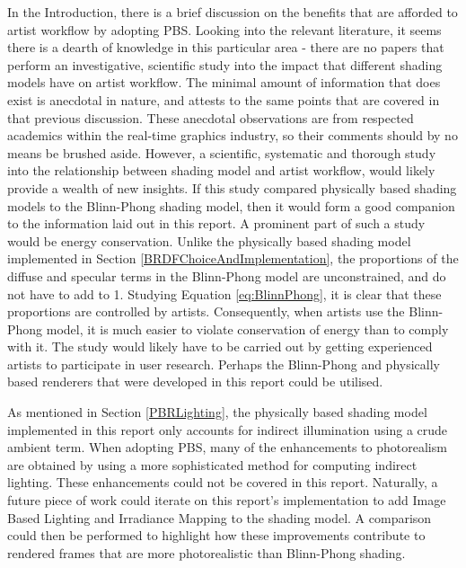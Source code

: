 In the Introduction, there is a brief discussion on the benefits that are afforded to artist workflow by adopting PBS. Looking into the relevant literature, it seems there is a dearth of knowledge in this particular area - there are no papers that perform an investigative, scientific study into the impact that different shading models have on artist workflow. The minimal amount of information that does exist is anecdotal in nature, and attests to the same points that are covered in that previous discussion. These anecdotal observations are from respected academics within the real-time graphics industry, so their comments should by no means be brushed aside. However, a scientific, systematic and thorough study into the relationship between shading model and artist workflow, would likely provide a wealth of new insights. If this study compared physically based shading models to the Blinn-Phong shading model, then it would form a good companion to the information laid out in this report. A prominent part of such a study would be energy conservation. Unlike the physically based shading model implemented in Section \ref{BRDFChoiceAndImplementation}, the proportions of the diffuse and specular terms in the Blinn-Phong model are unconstrained, and do not have to add to 1. Studying Equation \ref{eq:BlinnPhong}, it is clear that these proportions are controlled by artists. Consequently, when artists use the Blinn-Phong model, it is much easier to violate conservation of energy than to comply with it. The study would likely have to be carried out by getting experienced artists to participate in user research. Perhaps the Blinn-Phong and physically based renderers that were developed in this report could be utilised.

As mentioned in Section \ref{PBRLighting}, the physically based shading model implemented in this report only accounts for indirect illumination using a crude ambient term. When adopting PBS, many of the enhancements to photorealism are obtained by using a more sophisticated method for computing indirect lighting. These enhancements could not be covered in this report. Naturally, a future piece of work could iterate on this report's implementation to add Image Based Lighting and Irradiance Mapping to the shading model. A comparison could then be performed to highlight how these improvements contribute to rendered frames that are more photorealistic than Blinn-Phong shading.